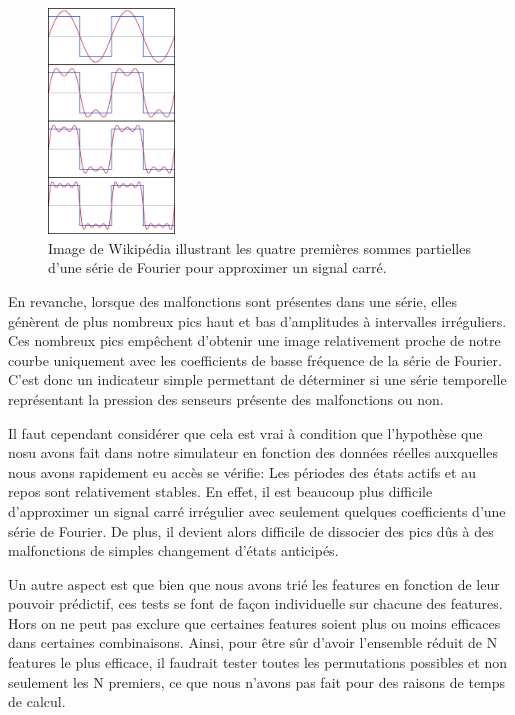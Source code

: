 \documentclass[french]{article}
\theoremstyle{mytheoremstyle}
\theoremstyle{mytheoremstyle}
\theoremstyle{myproblemstyle}
\begin{document}
        \begin{figure}[H]
            \centering
            \includegraphics[width=0.3\textwidth]{images/signal_carre.png}
            \caption{Image de Wikipédia illustrant les quatre premières sommes partielles d'une série de Fourier pour approximer un signal carré.}
            \label{}
        \end{figure}
        
        En revanche, lorsque des malfonctions sont présentes dans une série, elles génèrent de plus nombreux pics haut et bas d'amplitudes à intervalles irréguliers. Ces nombreux pics empêchent d'obtenir une image relativement proche de notre courbe uniquement avec les coefficients de basse fréquence de la série de Fourier. C'est donc un indicateur simple permettant de déterminer si une série temporelle représentant la pression des senseurs présente des malfonctions ou non.
        
        Il faut cependant considérer que cela est vrai à condition que l'hypothèse que nosu avons fait dans notre simulateur en fonction des données réelles auxquelles nous avons rapidement eu accès se vérifie: Les périodes des états actifs et au repos sont relativement stables. En effet, il est beaucoup plus difficile d'approximer un signal carré irrégulier avec seulement quelques coefficients d'une série de Fourier. De plus, il devient alors difficile de dissocier des pics dûs à des malfonctions de simples changement d'états anticipés.
        
    Un autre aspect est que bien que nous avons trié les features en fonction de leur pouvoir prédictif, ces tests se font de façon individuelle sur chacune des features. Hors on ne peut pas exclure que certaines features soient plus ou moins efficaces dans certaines combinaisons. Ainsi, pour être sûr d'avoir l'ensemble réduit de N features le plus efficace, il faudrait tester toutes les permutations possibles et non seulement les N premiers, ce que nous n'avons pas fait pour des raisons de temps de calcul.
    
\end{document}
